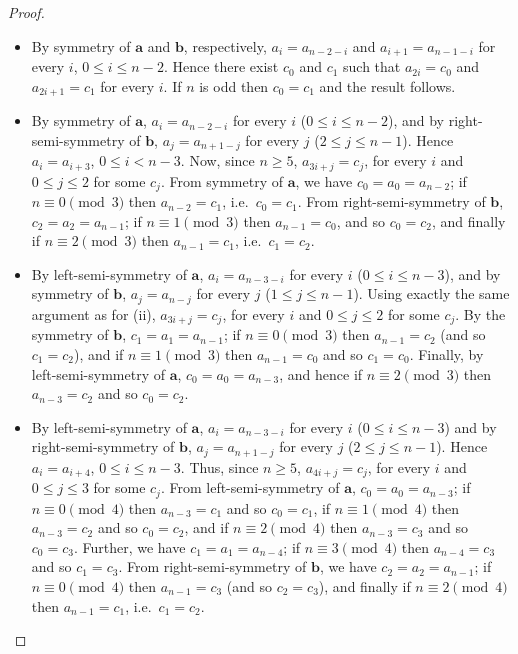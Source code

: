 \documentclass[a4paper,11pt]{article}
\begin{document}
\begin{proof}
\begin{itemize}
\item[i)] By symmetry of $\mathbf{a}$ and $\mathbf{b}$, respectively, $a_i=a_{n-2-i}$ and
    $a_{i+1}=a_{n-1-i}$ for every $i$, $0\leq i\leq n-2$.  Hence there exist $c_0$ and $c_1$
    such that $a_{2i}=c_0$ and $a_{2i+1}=c_1$ for every $i$.  If $n$ is odd then $c_0=c_1$ and
    the result follows.
\item[ii)] By symmetry of $\mathbf{a}$, $a_i=a_{n-2-i}$ for every $i$ ($0\leq i\leq n-2$), and
    by right-semi-symmetry of $\mathbf{b}$, $a_{j}=a_{n+1-j}$ for every $j$ ($2\leq j\leq
    n-1$). Hence $a_i=a_{i+3}$, $0\leq i< n-3$.  Now, since $n\geq5$, $a_{3i+j}=c_j$, for every
    $i$ and $0\leq j\leq 2$ for some $c_j$.  From symmetry of $\mathbf{a}$, we have
    $c_0=a_0=a_{n-2}$; if $n\equiv0\pmod3$ then $a_{n-2}=c_1$, i.e.\ $c_0=c_1$. From
    right-semi-symmetry of $\mathbf{b}$, $c_2=a_2=a_{n-1}$; if $n\equiv1\pmod3$ then
    $a_{n-1}=c_0$, and so $c_0=c_2$, and finally if $n\equiv2\pmod3$ then $a_{n-1}=c_1$, i.e.\
    $c_1=c_2$.
\item[iii)] By left-semi-symmetry of $\mathbf{a}$, $a_i=a_{n-3-i}$ for every $i$ ($0\leq i\leq
    n-3$), and by symmetry of $\mathbf{b}$, $a_j=a_{n-j}$ for every $j$ ($1\leq j\leq n-1$).
    Using exactly the same argument as for (ii), $a_{3i+j}=c_j$, for every $i$ and $0\leq j\leq
    2$ for some $c_j$. By the symmetry of $\mathbf{b}$, $c_1=a_1=a_{n-1}$; if $n\equiv0\pmod3$
    then $a_{n-1}=c_2$ (and so $c_1=c_2$), and if $n\equiv1\pmod3$ then $a_{n-1}=c_0$ and so
    $c_1=c_0$.  Finally, by left-semi-symmetry of $\mathbf{a}$, $c_0=a_0=a_{n-3}$, and hence if
    $n\equiv2\pmod3$ then $a_{n-3}=c_2$ and so $c_0=c_2$.
\item[iv)] By left-semi-symmetry of $\mathbf{a}$,  $a_i=a_{n-3-i}$ for every $i$ ($0\leq i\leq
    n-3$) and by right-semi-symmetry of $\mathbf{b}$, $a_{j}=a_{n+1-j}$ for every $j$ ($2\leq
    j\leq n-1$). Hence $a_i=a_{i+4}$, $0\leq i\leq n-3$.  Thus, since $n\geq5$, $a_{4i+j}=c_j$,
    for every $i$ and $0\leq j\leq 3$ for some $c_j$. From left-semi-symmetry of $\mathbf{a}$,
    $c_0=a_0=a_{n-3}$; if $n\equiv0\pmod4$ then $a_{n-3}=c_1$ and so $c_0=c_1$, if
    $n\equiv1\pmod4$ then $a_{n-3}=c_2$ and so $c_0=c_2$, and if $n\equiv2\pmod4$ then
    $a_{n-3}=c_3$ and so $c_0=c_3$. Further, we have $c_1=a_1=a_{n-4}$; if $n\equiv3\pmod4$
    then $a_{n-4}=c_3$ and so $c_1=c_3$. From right-semi-symmetry of $\mathbf{b}$, we have
    $c_2=a_2=a_{n-1}$; if $n\equiv0\pmod4$ then $a_{n-1}=c_3$ (and so $c_2=c_3$), and finally
    if $n\equiv2\pmod4$ then $a_{n-1}=c_1$, i.e.\ $c_1=c_2$.
\end{itemize}
\end{proof}
\end{document}
